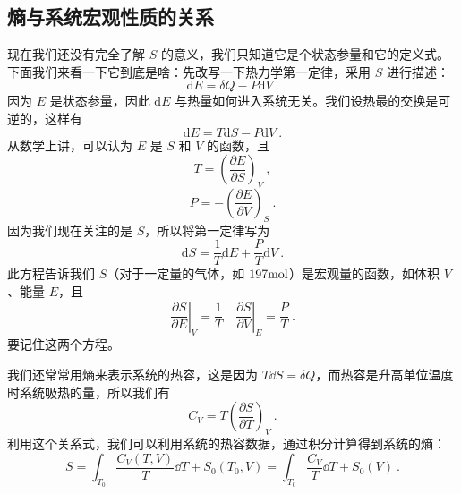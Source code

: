 \subsection{熵与系统宏观性质的关系}
现在我们还没有完全了解 $S$ 的意义，我们只知道它是个状态参量和它的定义式。下面我们来看一下它到底是啥：先改写一下热力学第一定律，采用 $S$ 进行描述：
\begin{equation}
\mathrm d E = \delta{Q} - P\mathrm d V~.
\end{equation}
因为 $E$ 是状态参量，因此 $\mathrm d E$ 与热量如何进入系统无关。我们设热最的交换是可逆的，这样有
\begin{equation}
\mathrm d E =T\mathrm dS - P\mathrm d V~.
\end{equation}
从数学上讲，可以认为 $E$ 是 $S $ 和 $V $ 的函数，且
\begin{equation}
T=\left(\frac{\partial E}{\partial S}\right)_V~,
\end{equation}
\begin{equation}
P=-\left(\frac{\partial E}{\partial V}\right)_S~.
\end{equation}
因为我们现在关注的是 $S$，所以将第一定律写为
\begin{equation}
\text{d}S=\frac{1}{T}\text{d}E+\frac{P}{T}\text{d}V~.
\end{equation}
此方程告诉我们 $S$（对于一定量的气体，如 $197 \rm mol$）是宏观量的函数，如体积 $V $、能量 $E$，且
\begin{equation}
\left. \frac{\partial S}{\partial E} \right|_V=\frac{1}{T}\quad \left. \frac{\partial S}{\partial V} \right|_E=\frac{P}{T}~.
\end{equation}
要记住这两个方程。

我们还常常用熵来表示系统的热容，这是因为 $T\dd S=\delta Q$，而热容是升高单位温度时系统吸热的量，所以我们有
\begin{equation}
C_V=T\left(\frac{\partial S}{\partial T}\right)_V~.
\end{equation}
利用这个关系式，我们可以利用系统的热容数据，通过积分计算得到系统的熵：
\begin{equation}
S=\int_{T_0} \frac{C_V(T,V)}{T} \dd T+S_0(T_0,V)=
\int_{T_0} \frac{C_V}{T} \dd T+S_0(V)~.
\end{equation}


 
